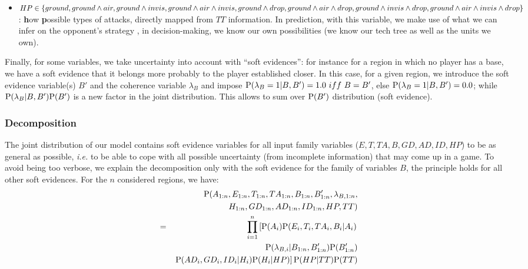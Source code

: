 \begin{itemize}
    \item $HP \in \begin{small}\{ground, ground\wedge air, ground\wedge invis, ground\wedge air\wedge invis, ground\wedge drop, ground\wedge air\wedge drop, ground\wedge invis\wedge drop, ground\wedge air\wedge invis\wedge drop\}\end{small}$: \textbf{h}ow \textbf{p}ossible types of attacks, directly mapped from $TT$ information. In prediction, with this variable, we make use of what we can infer on the opponent's strategy \cite{SYNNAEVE:OpeningPred,SYNNAEVE:StratPred}, in decision-making, we know our own possibilities (we know our tech tree as well as the units we own).
\end{itemize}
Finally, for some variables, we take uncertainty into account with ``soft evidences'': for instance for a region in which no player has a base, we have a soft evidence that it belongs more probably to the player established closer. In this case, for a given region, we introduce the soft evidence variable(s) $B'$ and the coherence variable $\lambda_B$ and impose $\PP(\lambda_B=1|B,B')=1.0\ iff\ B=B'$, else $\mathrm{P}(\lambda_B=1|B,B')=0.0$; while $\mathrm{P}(\lambda_B|B,B')\mathrm{P}(B')$ is a new factor in the joint distribution. This allows to sum over $\mathrm{P}(B')$ distribution (soft evidence).

\subsubsection{Decomposition}
The joint distribution of our model contains soft evidence variables for all input family variables ($E,T,TA,B,GD,AD,ID,HP$) to be as general as possible, \textit{i.e.} to be able to cope with all possible uncertainty (from incomplete information) that may come up in a game. To avoid being too verbose, we explain the decomposition only with the soft evidence for the family of variables $B$, the principle holds for all other soft evidences. For the $n$ considered regions, we have:
\begin{eqnarray}
    & & \mathrm{P}(A_{1:n}, E_{1:n}, T_{1:n}, TA_{1:n}, B_{1:n}, B'_{1:n}, \lambda_{B,1:n}, \\
& & H_{1:n}, GD_{1:n}, AD_{1:n}, ID_{1:n}, HP, TT) \\
    & = & \prod_{i=1}^n \left[\mathrm{P}(A_i)\mathrm{P}(E_i,T_i,TA_i,B_i|A_i) \label{eqn:tacticsdecomposition}\right.\\
& & \mathrm{P}(\lambda_{B,i} | B_{1:n},B'_{1:n})\mathrm{P}(B'_{1:n}) \\
& & \left. \mathrm{P}(AD_i,GD_i,ID_i|H_i)\mathrm{P}(H_i|HP)\right]\mathrm{P}(HP|TT)\mathrm{P}(TT)
\end{eqnarray}

